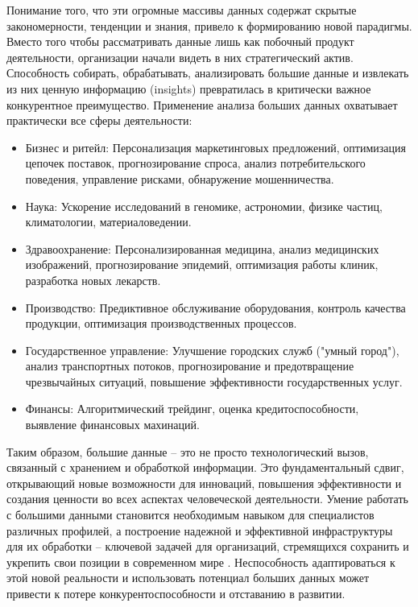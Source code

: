 Понимание того, что эти огромные массивы данных содержат скрытые закономерности, тенденции и знания, привело к формированию новой парадигмы. Вместо того чтобы рассматривать данные лишь как побочный продукт деятельности, организации начали видеть в них стратегический актив. Способность собирать, обрабатывать, анализировать большие данные и извлекать из них ценную информацию (insights) превратилась в критически важное конкурентное преимущество.
Применение анализа больших данных охватывает практически все сферы деятельности:
\begin{itemize}
	\item Бизнес и ритейл: Персонализация маркетинговых предложений, оптимизация цепочек поставок, прогнозирование спроса, анализ потребительского поведения, управление рисками, обнаружение мошенничества\cite{siegel_predictive_analytics}.
	\item Наука: Ускорение исследований в геномике, астрономии, физике частиц\cite{korenkov_bec}, климатологии, материаловедении.
	\item Здравоохранение: Персонализированная медицина, анализ медицинских изображений, прогнозирование эпидемий, оптимизация работы клиник, разработка новых лекарств.
	\item Производство: Предиктивное обслуживание оборудования, контроль качества продукции, оптимизация производственных процессов.
	\item Государственное управление: Улучшение городских служб ("умный город"), анализ транспортных потоков, прогнозирование и предотвращение чрезвычайных ситуаций, повышение эффективности государственных услуг.
	\item Финансы: Алгоритмический трейдинг, оценка кредитоспособности, выявление финансовых махинаций.
\end{itemize}
Таким образом, большие данные – это не просто технологический вызов, связанный с хранением и обработкой информации. Это фундаментальный сдвиг, открывающий новые возможности для инноваций, повышения эффективности и создания ценности во всех аспектах человеческой деятельности. Умение работать с большими данными становится необходимым навыком для специалистов различных профилей, а построение надежной и эффективной инфраструктуры для их обработки – ключевой задачей для организаций, стремящихся сохранить и укрепить свои позиции в современном мире \cite{davenport_data_scientist}. Неспособность адаптироваться к этой новой реальности и использовать потенциал больших данных может привести к потере конкурентоспособности и отставанию в развитии.

